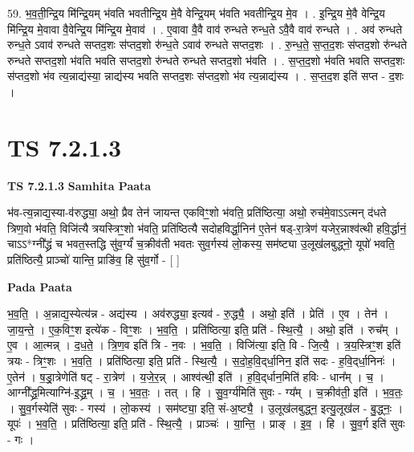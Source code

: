 \documentclass[17pt]{extarticle}
\begin{document}
59. भ॒व॒ती॒न्द्रि॒य मि॑न्द्रि॒यम् भ॑वति भवतीन्द्रि॒य मे॒वै वेन्द्रि॒यम् भ॑वति भवतीन्द्रि॒य मे॒व । . इ॒न्द्रि॒य मे॒वै वेन्द्रि॒य मि॑न्द्रि॒य मे॒वावा वै॒वेन्द्रि॒य मि॑न्द्रि॒य मे॒वाव॑ । . ए॒वावा वै॒वै वाव॑ रुन्धते रुन्ध॒ते ऽवै॒वै वाव॑ रुन्धते । . अव॑ रुन्धते रुन्ध॒ते ऽवाव॑ रुन्धते सप्तद॒शः स॑प्तद॒शो रु॑न्ध॒ते ऽवाव॑ रुन्धते सप्तद॒शः । . रु॒न्ध॒ते॒ स॒प्त॒द॒शः स॑प्तद॒शो रु॑न्धते रुन्धते सप्तद॒शो भ॑वति भवति सप्तद॒शो रु॑न्धते रुन्धते सप्तद॒शो भ॑वति । . स॒प्त॒द॒शो भ॑वति भवति सप्तद॒शः स॑प्तद॒शो भ॑व त्य॒न्नाद्य॑स्या॒ न्नाद्य॑स्य भवति सप्तद॒शः स॑प्तद॒शो भ॑व त्य॒न्नाद्य॑स्य । . स॒प्त॒द॒श इति॑ सप्त - द॒शः । \newline
\pagebreak
{}

\section{ TS 7.2.1.3 }

\textbf{TS 7.2.1.3 } \newline
\textbf{Samhita Paata} \newline

भ॑व-त्य॒न्नाद्य॒स्या-व॑रुद्ध्या॒ अथो॒ प्रैव तेन॑ जायन्त एकविꣳ॒॒शो भ॑वति॒ प्रति॑ष्ठित्या॒ अथो॒ रुच॑मे॒वाऽऽत्मन् द॑धते त्रिण॒वो भ॑वति॒ विजि॑त्यै त्रयस्त्रिꣳ॒॒शो भ॑वति॒ प्रति॑ष्ठित्यै सदोहविर्द्धा॒निन॑ ए॒तेन॑ षड्-रा॒त्रेण॑ यजेर॒न्नाश्व॑त्थी हवि॒र्द्धानं॒ चाऽऽ*ग्नी᳚द्ध्रं च भवत॒स्तद्धि सु॑व॒र्ग्यं॑ च॒क्रीव॑ती भवतः सुव॒र्गस्य॑ लो॒कस्य॒ सम॑ष्ट्या उ॒लूख॑लबुद्ध्नो॒ यूपो॑ भवति॒ प्रति॑ष्ठित्यै॒ प्राञ्चो॑ यान्ति॒ प्राङि॑व॒ हि सु॑व॒र्गो - [  ] \newline

\textbf{Pada Paata} \newline

भ॒व॒ति॒ । अ॒न्नाद्य॒स्येत्य॑न्न - अद्य॑स्य । अव॑रुद्ध्या॒ इत्यव॑ - रु॒द्ध्यै॒ । अथो॒ इति॑ । प्रेति॑ । ए॒व । तेन॑ । जा॒य॒न्ते॒ । ए॒क॒विꣳ॒॒श इत्ये॑क - विꣳ॒॒शः । भ॒व॒ति॒ । प्रति॑ष्ठित्या॒ इति॒ प्रति॑ - स्थि॒त्यै॒ । अथो॒ इति॑ । रुच᳚म् । ए॒व । आ॒त्मन्न् । द॒ध॒ते॒ । त्रि॒ण॒व इति॑ त्रि - न॒वः । भ॒व॒ति॒ । विजि॑त्या॒ इति॒ वि - जि॒त्यै॒ । त्र॒य॒स्त्रिꣳ॒॒श इति॑ त्रयः - त्रिꣳ॒॒शः । भ॒व॒ति॒ । प्रति॑ष्ठित्या॒ इति॒ प्रति॑ - स्थि॒त्यै॒ । स॒दो॒ह॒वि॒द्‌र्धा॒निन॒ इति॑ सदः - ह॒वि॒द्‌र्धा॒निनः॑ । ए॒तेन॑ । ष॒ड्रा॒त्रेणेति॑ षट् - रा॒त्रेण॑ । य॒जे॒र॒न्न् । आश्व॑त्थी॒ इति॑ । ह॒वि॒द्‌र्धान॒मिति॑ हविः - धान᳚म् । च॒ । आग्नी᳚द्ध्र॒मित्याग्नि॑-इ॒द्ध्र॒म् । च॒ । भ॒व॒तः॒ । तत् । हि । सु॒व॒र्ग्य॑मिति॑ सुवः - ग्य᳚म् । च॒क्रीव॑ती॒ इति॑ । भ॒व॒तः॒ । सु॒व॒र्गस्येति॑ सुवः - गस्य॑ । लो॒कस्य॑ । सम॑ष्ट्या॒ इति॒ सं-अ॒ष्ट्यै॒ । उ॒लूख॑लबुद्ध्न॒ इत्यु॒लूख॑ल - बु॒द्ध्नः॒ । यूपः॑ । भ॒व॒ति॒ । प्रति॑ष्ठित्या॒ इति॒ प्रति॑ - स्थि॒त्यै॒ । प्राञ्चः॑ । या॒न्ति॒ । प्राङ् । इ॒व॒ । हि । सु॒व॒र्ग इति॑ सुवः - गः ।  \newline
\end{document}
